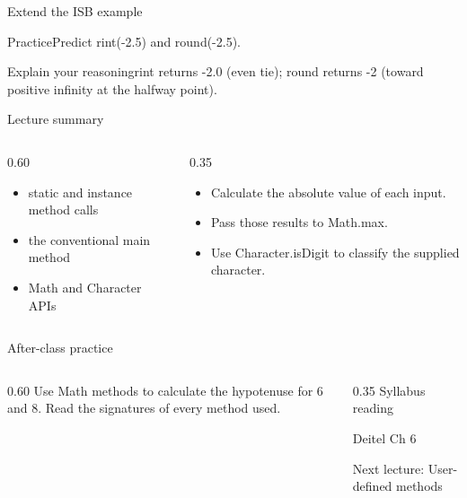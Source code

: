\documentclass[10pt,aspectratio=169]{beamer}
\begin{document}
\begin{frame}[fragile,t]{Extend the ISB example}
\begin{alertblock}{Practice}Predict rint({-}2.5) and round({-}2.5).\end{alertblock}\vspace{3mm}\begin{exampleblock}{Explain your reasoning}rint returns {-}2.0 (even tie); round returns {-}2 (toward positive infinity at the halfway point).\end{exampleblock}
\end{frame}
\begin{frame}[fragile,t]{Lecture summary}
\begin{columns}[T,onlytextwidth]\begin{column}{0.60\textwidth}
\begin{itemize}
\item static and instance method calls
\item the conventional main method
\item Math and Character APIs
\end{itemize}
\end{column}\begin{column}{0.35\textwidth}\small
\begin{itemize}
\item Calculate the absolute value of each input.
\item Pass those results to Math.max.
\item Use Character.isDigit to classify the supplied character.
\end{itemize}
\end{column}\end{columns}
\end{frame}

\begin{frame}[fragile,t]{After-class practice}
\begin{columns}[T,onlytextwidth]\begin{column}{0.60\textwidth}
Use Math methods to calculate the hypotenuse for 6 and 8. Read the signatures of every method used.
\end{column}\begin{column}{0.35\textwidth}\small
Syllabus reading\par Deitel Ch 6

Next lecture: User-defined methods
\end{column}\end{columns}
\end{frame}
\end{document}
